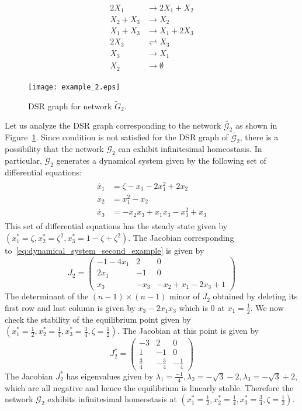 \documentclass[11pt]{article}
\theoremstyle{plain}
\theoremstyle{definition}
\theoremstyle{remark}
\newcommand\GG{\mathcal{G}}
\begin{document}
\begin{eqnarray}
\begin{split}
2X_1 &\rightarrow 2X_1 + X_2 \\
X_2 + X_3 &\rightarrow X_2 \\
X_1 + X_3 &\rightarrow X_1 + 2X_3 \\
2X_3 &\rightleftharpoons X_3 \\
X_3 &\rightarrow X_1 \\
X_2 &\rightarrow \emptyset 
\end{split}
\end{eqnarray}


\begin{figure}[h!]
\centering
\texttt{[image: example\_2.eps]}
\caption{DSR graph for network $\tilde{G}_2$.}
\label{fig:DSR_graph_2}
\end{figure}


Let us analyze the DSR graph corresponding to the network $\tilde{\GG_2}$ as shown in Figure~\ref{fig:DSR_graph_2}. Since condition is not satisfied for the DSR graph of $\tilde{\GG_2}$, there is a possibility that the network $\GG_2$ can exhibit infinitesimal homeostasis. In particular, $\GG_2$ generates a dynamical system given by the following set of differential equations:
\begin{eqnarray}\label{eq:dynamical_system_second_example}
\begin{split}
\dot{x_1} &= \zeta - x_1 -2x_1^2 + 2x_2 \\
\dot{x_2} &= x^2_1 - x_2 \\
\dot{x_3} &= -x_2x_3 + x_1x_3 - x^2_3 + x_3 
\end{split}
\end{eqnarray}
%
This set of differential equations has the steady state given by $(x^*_1 = \zeta, x^*_2 = \zeta^2, x^*_3 = 1 - \zeta + \zeta^2)$. The Jacobian corresponding to~\ref{eq:dynamical_system_second_example} is given by
$$J_2=
\begin{pmatrix} 
-1 - 4x_1 &  2   & 0 \\
2x_1      & -1   & 0 \\
x_3       & -x_3 & -x_2 + x_1 -2x_3 +1 
\end{pmatrix}
$$
%
The determinant of the $(n-1)\times (n-1)$ minor of  $J_2 $ obtained by deleting its first row and last column is given by $x_3 - 2x_1x_3$ which is $0$ at $x_1=\frac{1}{2}$. We now check the stability of the equilibrium point given by $(x^*_1 = \frac{1}{2}, x^*_2 = \frac{1}{4}, x^*_3 = \frac{3}{4}, \zeta = \frac{1}{2})$. The Jacobian at this point is given by 
$$J^*_2=
\begin{pmatrix} 
-3 &  2   & 0 \\
1  & -1   & 0 \\
\frac{3}{4}  & -\frac{3}{4} & -\frac{1}{4} 
\end{pmatrix}
$$
%
The Jacobian $J^*_2$ has eigenvalues given by $\lambda_1 = \frac{-1}{4}, \lambda_2 = -\sqrt{3} - 2, \lambda_3 = -\sqrt{3} + 2$, which are all negative and hence the equilibrium is linearly stable. Therefore the network $\GG_2$ exhibits infinitesimal homeostasis at $(x^*_1 = \frac{1}{2}, x^*_2 = \frac{1}{4}, x^*_3 = \frac{3}{4}, \zeta = \frac{1}{2})$.
\end{document}

